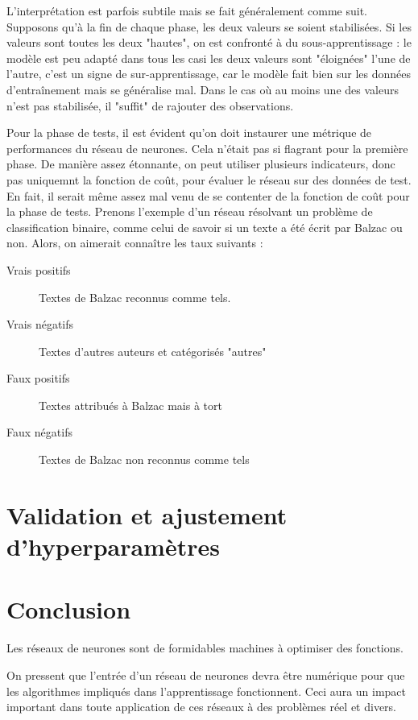 L'interprétation est parfois subtile mais se fait généralement comme suit. Supposons qu'à la fin de chaque phase, les deux valeurs se soient stabilisées. Si les valeurs sont toutes les deux "hautes", on est confronté à du sous-apprentissage : le modèle est peu adapté dans tous les casi les deux valeurs sont "éloignées" l'une de l'autre, c'est un signe de sur-apprentissage, car le modèle fait bien sur les données d'entraînement mais se généralise mal.
Dans le cas où au moins une des valeurs n'est pas stabilisée, il "suffit" de rajouter des observations.

Pour la phase de tests, il est évident qu'on doit instaurer une métrique de performances du réseau de neurones. Cela n'était pas si flagrant pour la première phase. De manière assez étonnante, on peut utiliser plusieurs indicateurs, donc pas uniquemnt la fonction de coût, pour évaluer le réseau sur des données de test. En fait, il serait même assez mal venu de se contenter de la fonction de coût pour la phase de tests. Prenons l'exemple d'un réseau résolvant un problème de classification binaire, comme celui de savoir si un texte a été écrit par Balzac ou non. Alors, on aimerait connaître les taux suivants :

\begin{description}
\item[Vrais positifs] Textes de Balzac reconnus comme tels.
\item[Vrais négatifs] Textes d'autres auteurs et catégorisés "autres"
\item[Faux positifs] Textes attribués à Balzac mais à tort
\item[Faux négatifs] Textes de Balzac non reconnus comme tels
\end{description}



\section{Validation et ajustement d'hyperparamètres}

\section{Conclusion}

Les réseaux de neurones sont de formidables machines à optimiser des fonctions.

On pressent que l'entrée d'un réseau de neurones devra être numérique pour que les algorithmes impliqués dans l'apprentissage 
fonctionnent. Ceci aura un impact important dans toute application de ces réseaux à des problèmes réel et divers.